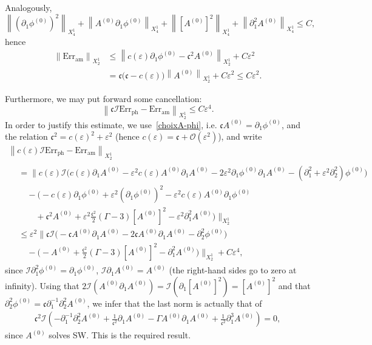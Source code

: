 \documentclass[AHL,Unicode,longabstracts,published]{cedram}
\newcommand*\p{\partial}
\newcommand{\amm}{\mathrm{am}}
\newcommand{\phl}{\mathrm{ph}}
\newcommand{\Err}{\mathrm{Err}}
\newcommand*\BO{\mathcal{O}}
\newcommand*\BI{\mathcal{I}}
\newcommand*\cs{{\mathfrak c}}
\newcommand*\ls{\leqslant }
\newcommand*\e{\varepsilon}
\begin{document}
Analogously,
\[
\left\| \left(\p_{1} \phi^{(0)}\right)^2\right\|_{ X^1_4 } + \left\| A^{(0)} \p_{1} \phi^{(0)}\right\|_{ X^1_4 } + \left\| \left[A^{(0)}\right]^2 \right\|_{X^1_{4}} + \left\| \p_1^2 A^{(0)} \right\|_{ X^1_4 }
\ls C,
\]
hence
\begin{align*}
\left\| \Err_{\amm} \right\|_{ X^1_2 } & \ls
\left\| c(\e) \p_{1} \phi^{(0)} - \cs^2 A^{(0)} \right\|_{ X^1_2 } + C \e^2
\\ & = \cs \big(\cs - c(\e) \big) \left\| A^{(0)} \right\|_{ X^1_2 } + C \e^2
\ls C \e^2.
\end{align*}

Furthermore, we may put forward some cancellation:
\[
\left\| \cs \BI {\Err}_{\phl} - {\Err}_{\amm}\right\|_{X^1_2} \ls C \e^4.
\]
In order to justify this estimate, we use~\eqref{choixA-phi}, i.e. $ \cs A^{(0)} = \p_1 \phi^{(0)} $, and the relation $ \cs^2 = c(\e)^2 + \e^2 $ (hence $ c(\e) = \cs + \BO (\e^2) $), and write
\begin{multline*}
\left\| c(\e) \BI {\Err}_{\phl} - {\Err}_{\amm} \right\|_{X^1_2}
\\
\begin{aligned}
& = \Big\| c(\e) \BI \Big(c(\e) \p_{1} A^{(0)} - \e^2 c (\e) A^{(0)} \p_{1} A^{(0)} - 2 \e^2 \p_{1} \phi^{(0)} \p_{1} A^{(0)} - \left(\p_{1}^2 + \e^2 \p^2_{2}\right) \phi^{(0)} \Big)
\\ &
\quad - \Big(- c(\e) \p_{1} \phi^{(0)} + \e^2 \left(\p_{1} \phi^{(0)}\right)^2 - \e^2 c(\e) A^{(0)} \p_{1} \phi^{(0)}
\\ &
\qquad + \cs^2 A^{(0)} + \e^2 \frac{\cs^2}{2} (\Gamma -3) \left[A^{(0)}\right]^2 - \e^2 \p_{1}^2 A^{(0)} \Big) \Big\|_{X^1_2}
\\ &
\ls \e^2 \Big\| \cs \BI \Big(- \cs A^{(0)} \p_{1} A^{(0)} - 2 \cs A^{(0)} \p_{1} A^{(0)} - \p^2_{2} \phi^{(0)} \Big)
\\ &
\quad - \Big(- A^{(0)} + \frac{ \cs^2}{2} (\Gamma -3) \left[A^{(0)}\right]^2 - \p_{1}^2 A^{(0)} \Big) \Big\|_{X^1_2} + C \e^4,
\end{aligned}
\end{multline*}
since $ \BI \p_{1}^2 \phi^{(0)} = \p_{1} \phi^{(0)} $, $ \BI \p_{1} A^{(0)} = A^{(0)} $ (the right-hand sides go to zero at infinity). Using that $ 2 \BI (A^{(0)} \p_{1} A^{(0)}) = \BI (\p_{1} [A^{(0)}]^2) = [A^{(0)}]^2 $ and that $ \p_2^2 \phi^{(0)} = \cs \p_1^{-1} \p_2^2 A^{(0)} $, we infer that the last norm is actually that of
\begin{align*}
\cs^2 \BI \left(- \p_1^{-1} \p_2^2 A^{(0)} + \frac{1}{\cs^2} \p_{1} A^{(0)} - \Gamma A^{(0)} \p_{1} A^{(0)} + \frac{1}{\cs^2} \p_1^3 A^{(0)} \right) = 0,
\end{align*}
since $ A^{(0)}$ solves SW. This is the required result.
\end{document}

